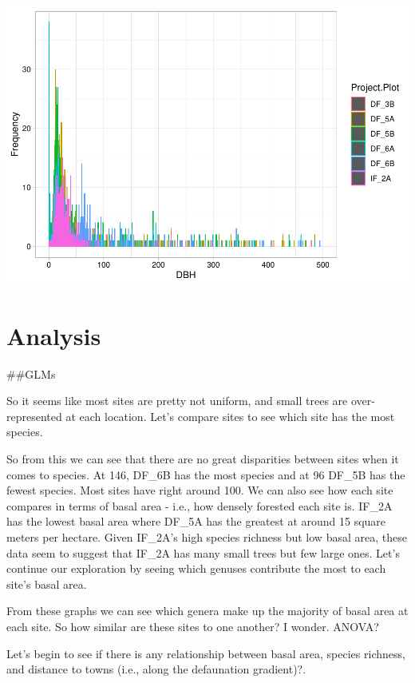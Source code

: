 \documentclass[
  12pt,
]{article}
\begin{document}
\includegraphics{GoldenGriffithsKnierMalinowski_ENV872_Project_files/figure-latex/DBH graphs-10.pdf}

\hypertarget{analysis}{%
\section{Analysis}\label{analysis}}

\#\#GLMs

So it seems like most sites are pretty not uniform, and small trees are
over-represented at each location. Let's compare sites to see which site
has the most species.

So from this we can see that there are no great disparities between
sites when it comes to species. At 146, DF\_6B has the most species and
at 96 DF\_5B has the fewest species. Most sites have right around 100.
We can also see how each site compares in terms of basal area - i.e.,
how densely forested each site is. IF\_2A has the lowest basal area
where DF\_5A has the greatest at around 15 square meters per hectare.
Given IF\_2A's high species richness but low basal area, these data seem
to suggest that IF\_2A has many small trees but few large ones. Let's
continue our exploration by seeing which genuses contribute the most to
each site's basal area.

From these graphs we can see which genera make up the majority of basal
area at each site. So how similar are these sites to one another? I
wonder. ANOVA?

Let's begin to see if there is any relationship between basal area,
species richness, and distance to towns (i.e., along the defaunation
gradient)?.
\end{document}
